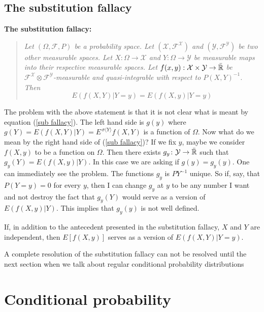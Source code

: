 \subsection{The substitution fallacy}
{\bf The substitution fallacy:}
\begin{quote}
 \it Let $(\Omega, \mathcal F, P)$  be a probability space.
Let $(\mathcal X, \mathcal F^{\mathcal X})$ and $(\mathcal Y, \mathcal F^{\mathcal Y})$ be two other measurable spaces. Let $X\colon \Omega\rightarrow \mathcal X$ and $Y\colon \Omega \rightarrow \mathcal Y$ be measurable maps into their respective measurable spaces.
 Let $f(x,y): \mathcal X \times \mathcal Y \rightarrow \bar{\Bbb R}$ be $\mathcal F^{\mathcal X}\otimes \mathcal F^{\mathcal Y}$-measurable and quasi-integrable with respect to $P(X,Y)^{-1}$. Then
\begin{equation}
\label{sub fallacy}
E(f(X,Y)|Y=y) = E(f(X,y)|Y=y)
\end{equation}
\end{quote}

The problem with the above statement is that it is not clear what is meant by equation (\ref{sub fallacy}). The left hand side is $g(y)$ where $g(Y) = E(f(X,Y)|Y) = E^{\, \sigma\langle Y\rangle} f(X,Y)$ is a function of $\Omega$. Now what do we mean by the right hand side of (\ref{sub fallacy})? If we fix $y$, maybe we consider $f(X,y)$ to be a function on $\Omega$. Then  there exists $g_y \colon \mathcal Y \rightarrow \bar{\Bbb R}$ such that $g_y(Y)= E(f(X,y) | Y)$. In this case we are asking if $g(y)=g_y(y)$. One can immediately see the problem. The functions $g_y$ is $PY^{-1}$ unique. So if, say, that $P(Y=y)=0$ for every $y$, then I can change $g_y$ at $y$ to be any number I want and not destroy the fact that $g_y(Y)$ would serve as a version of $E(f(X,y) | Y)$. This implies that $g_y(y)$ is not well defined.


\begin{theorem}
If,  in addition to the antecedent presented in the substitution fallacy, $X$ and $Y$ are independent, then $E[f(X,y)]$ serves as a version of $E(f(X,Y)|Y=y)$.
\end{theorem}

A complete resolution of the substitution fallacy can not be resolved until the next section when we talk about regular conditional probability distributions


\clearpage
%
%
\section{Conditional probability}


